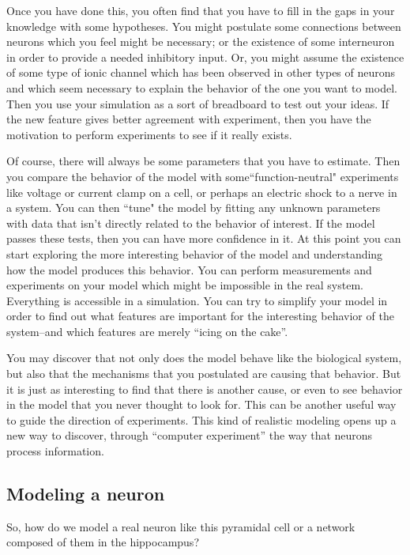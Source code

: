 \documentclass[12pt]{article}
\begin{document}
Once you have done this, you often find that you have to fill in the gaps in your knowledge with some hypotheses. You might postulate some connections between neurons which you feel might be necessary; or the existence of some interneuron in order to provide a needed inhibitory input. Or, you might assume the existence of some type of ionic channel which has been observed in other types of neurons and which seem necessary to explain the behavior of the one you want to model. Then you use your simulation as a sort of breadboard to test out your ideas. If the new feature gives better agreement with experiment, then you have the motivation to perform experiments to see if it really exists.

Of course, there will always be some parameters that you have to estimate. Then you compare the behavior of the model with some``function-neutral" experiments like voltage or current clamp on a cell, or perhaps an electric shock to a nerve in a system. You can then ``tune" the model by fitting any unknown parameters with data that isn't directly related to the behavior of interest. If the model passes these tests, then you can have more confidence in it. At this point you can start exploring the more interesting behavior of the model and understanding how the model produces this behavior. You can perform measurements and experiments on your model which might be impossible in the real system. Everything is accessible in a simulation. You can try to simplify your model in order to find out what features are important for the interesting behavior of the system--and which features are merely ``icing on the cake''.

You may discover that not only does the model behave like the biological system, but also that the mechanisms that you postulated are causing that behavior. But it is just as interesting to find that there is another cause, or even to see behavior in the model that you never thought to look for. This can be another useful way to guide the direction of experiments. This kind of realistic modeling opens up a new way to discover, through ``computer experiment'' the way that neurons process information.

\subsection*{Modeling a neuron}

So, how do we model a real neuron like this pyramidal cell or a network composed of them in the hippocampus?
\end{document}
